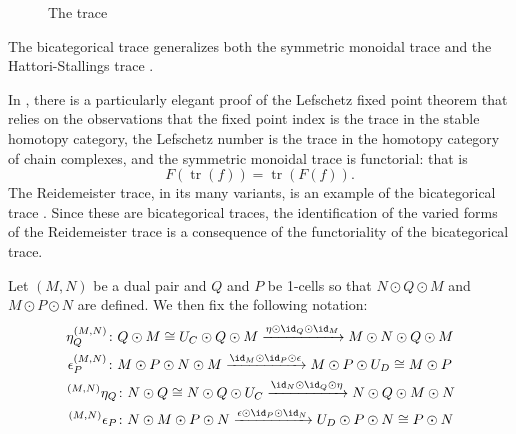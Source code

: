 \documentclass[11pt]{amsart}
\newcommand{\xto}{\xrightarrow}
\DeclareMathOperator{\tr}{tr}
\newcommand{\rsm}[4]{{#1}^{({#2},{#3})}_{#4}} %
\newcommand{\lsm}[4]{\,^{({#2},{#3})}{#1}_{#4}} %
\begin{document}
\begin{figure}
\caption{The trace}\label{fig:pasting_trace}
\end{figure}

The bicategorical trace generalizes both the symmetric monoidal trace \cite{dold_puppe} and the Hattori-Stallings trace \cite{hattori,stallings}.  

\begin{rmk}In \cite{dold_puppe}, there is a particularly elegant proof of the Lefschetz fixed point theorem that  relies on the observations that the fixed point index \cite{dold_idx} is the trace in the stable homotopy category, the Lefschetz number is the trace in the homotopy category of chain complexes, 
and the symmetric monoidal trace is functorial: that is 
\[
  F(\tr(f))=\tr(F(f)).
\]
The Reidemeister trace, in its many variants, is an example of the bicategorical trace \cite{p:thesis}.  Since these are bicategorical traces, the identification of the varied forms of the Reidemeister trace 
is a consequence of the functoriality of the bicategorical trace.
\end{rmk}

Let $(M,N)$ be a dual pair and $Q$ and $P$ be 1-cells so that $N\odot Q\odot M$ and $M\odot P\odot N$ are defined. We then  fix the following notation: 
\begin{gather*}
  \rsm{\eta}{M}{N}{Q}\colon Q\odot M\cong U_C\odot Q\odot M
  \xto{\eta\odot \id_Q\odot \id_M} 
  M\odot N\odot Q\odot M
 \\
  \rsm{\epsilon}{M}{N}{P}\colon M\odot P\odot N\odot M
  \xto{\id_M \odot \id_P \odot\epsilon}
  M\odot P\odot U_D\cong M\odot P
 \\
   \lsm{\eta}{M}{N}{Q} \colon N\odot Q\cong N\odot Q\odot U_C
  \xto{\id_N\odot \id_Q\odot \eta} N\odot Q\odot M\odot N
 \\
   \lsm{\epsilon}{M}{N}{P}\colon N\odot M\odot P\odot N
   \xto{\epsilon\odot \id_P \odot \id_N }
   U_D\odot P\odot N\cong P\odot N
\end{gather*}
\end{document}

